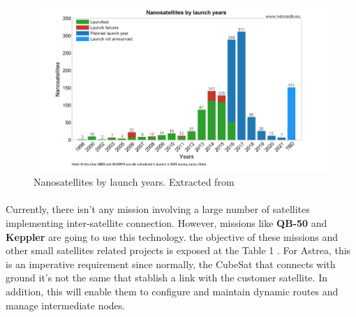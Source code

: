 \begin{figure}[H]
\centering
\includegraphics[scale=0.47]{img/launches.png}
\caption{Nanosatellites by launch years. Extracted from \cite{nanosats}}
\label{launches}
\end{figure}


\paragraph{}
Currently, there isn't any mission involving a large number of satellites implementing inter-satellite connection. However, missions like \textbf{QB-50} and \textbf{Keppler} are going to use this technology. the objective of these missions and other small satellites related projects is exposed at the Table 1
. For Astrea, this is an imperative requirement since normally, the CubeSat that connects with ground it’s not the same that stablish a link with the customer satellite. In addition, this will enable them to configure and maintain dynamic routes and manage intermediate nodes.

